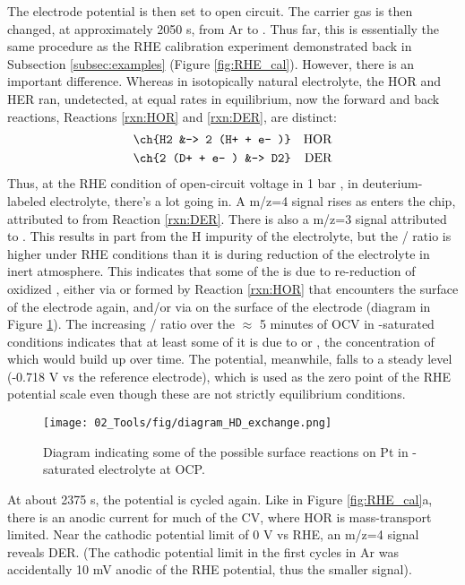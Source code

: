 The electrode potential is then set to open circuit. The carrier gas is then changed, at approximately 2050 s, from Ar to . Thus far, this is essentially the same procedure as the RHE calibration experiment demonstrated back in Subsection \ref{subsec:examples} (Figure \ref{fig:RHE_cal}). However, there is an important difference. Whereas in isotopically natural electrolyte, the HOR and HER ran, undetected, at equal rates in equilibrium, now the forward and back reactions, Reactions \ref{rxn:HOR} and \ref{rxn:DER}, are distinct:
\begin{align}
\ch{H2 &-> 2 (H+ + e- )}&&\text{HOR}\label{rxn:HOR}\\
\ch{2 (D+ + e- ) &-> D2}&&\text{DER}\label{rxn:DER}
\end{align}
Thus, at the RHE condition of open-circuit voltage in 1 bar , in deuterium-labeled electrolyte, there's a lot going in. A m/z=4 signal rises as  enters the chip, attributed to  from Reaction \ref{rxn:DER}. There is also a m/z=3 signal attributed to . This  results in part from the H impurity of the electrolyte, but the / ratio is higher under RHE conditions than it is during reduction of the electrolyte in inert atmosphere. This indicates that some of the  is due to re-reduction of oxidized , either via  or  formed by Reaction \ref{rxn:HOR} that encounters the surface of the electrode again, and/or via  on the surface of the electrode (diagram in Figure \ref{fig:HD_diagram}). The increasing / ratio over the $\approx$ 5 minutes of OCV in -saturated conditions indicates that at least some of it is due to  or , the concentration of which would build up over time. The potential, meanwhile, falls to a steady level (-0.718 V vs the reference electrode), which is used as the zero point of the RHE potential scale even though these are not strictly equilibrium conditions.
\begin{figure}[h!]
	\centering
	\texttt{[image: 02\_Tools/fig/diagram\_HD\_exchange.png]}
	\caption{Diagram indicating some of the possible surface reactions on Pt in -saturated  electrolyte at OCP.}
	\label{fig:HD_diagram}
\end{figure}

At about 2375 s, the potential is cycled again. Like in Figure \ref{fig:RHE_cal}a, there is an anodic current for much of the CV, where HOR is mass-transport limited. Near the cathodic potential limit of 0 V vs RHE, an m/z=4 signal reveals DER. (The cathodic potential limit in the first cycles in Ar was accidentally 10 mV anodic of the RHE potential, thus the smaller  signal). 

